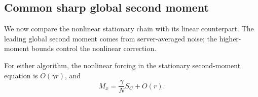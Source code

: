 \subsection{Common sharp global second moment}
\label{app:common-covariance}

We now compare the nonlinear stationary chain with its linear counterpart.
The leading global second moment comes from server-averaged noise; the
higher-moment bounds control the nonlinear correction.

\begin{lemma}
\label{lem:A-sharp-second-moment}
For either algorithm, the nonlinear forcing in the stationary second-moment
equation is $O(\gamma r)$, and
\begin{equation}
\label{eq:A-sharp-Mx}
 M_x=\frac{\gamma}{N}S_C+O(r).
\end{equation}
\end{lemma}

